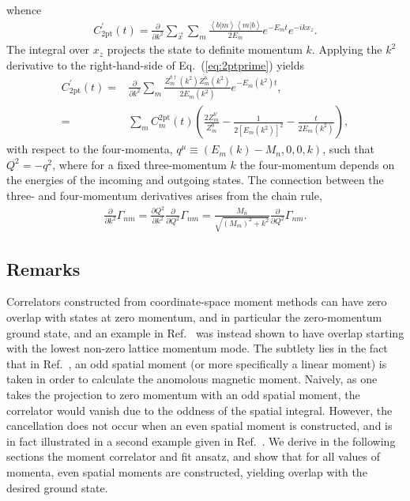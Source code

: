 \documentclass{PoS}
\begin{document}
whence
\begin{align}
C^\prime_{\text{2pt}}(t)=\frac{\partial}{\partial k^2} \sum_{\vec{x}} \sum_m \frac{\left<b | m\right>\left<m | b\right>}{2E_m} e^{-E_m t} e^{-ikx_z}.
\label{eq:2ptprime}
\end{align}
The integral over $x_z$ projects the state to definite momentum $k$. Applying the $k^2$ derivative to the right-hand-side of Eq.~(\ref{eq:2ptprime}) yields
\begin{align}
C^\prime_{\text{2pt}}(t) 
= & \frac{\partial}{\partial k^2} \sum_m \frac{Z^{b\dagger}_m(k^2)Z^b_m(k^2)}{2E_m(k^2)}e^{-E_m(k^2)t},\\
= & \sum_m C^{\text{2pt}}_m(t) \left(\frac{2Z_m^{b\prime}}{Z_m^b} - \frac{1}{2[E_m(k^2)]^2}-\frac{t}{2E_m(k^2)}\right),
\end{align}
with respect to the four-momenta, $q^\mu\equiv (E_m(k) - M_n, 0, 0, k)$, such that $Q^2=-q^2$, where for a fixed three-momentum $k$ the four-momentum depends on the energies of the incoming and outgoing states. The connection between the three- and four-momentum derivatives arises from the chain rule,
\begin{align}
\frac{\partial}{\partial k^2} \Gamma_{nm} =  \frac{\partial Q^2}{\partial k^2}\frac{\partial}{\partial Q^2}\Gamma_{nm}
=  \frac{M_n}{\sqrt{(M_m)^2+k^2}}\frac{\partial}{\partial Q^2} \Gamma_{nm}.
\end{align}


\subsection{Remarks}
Correlators constructed from coordinate-space moment methods can have zero overlap with states at zero momentum, and in particular the zero-momentum ground state, and an example in  Ref.~\cite{Wilcox:2002zt} was instead shown to have overlap starting with the lowest non-zero lattice momentum mode. The subtlety lies in the fact that in Ref.~\cite{Wilcox:2002zt}, an odd spatial moment (or more specifically a linear moment) is taken in order to calculate the anomolous magnetic moment. Naively, as one takes the projection to zero momentum with an odd spatial moment, the correlator would vanish due to the oddness of the spatial integral.  However, the cancellation does not occur when an even spatial moment is constructed, and is in fact illustrated in a second example given in Ref.~\cite{Wilcox:2002zt}. We derive in the following sections the moment correlator and fit ansatz, and show that for all values of momenta, even spatial moments are constructed, yielding overlap with the desired ground state.
\end{document}
